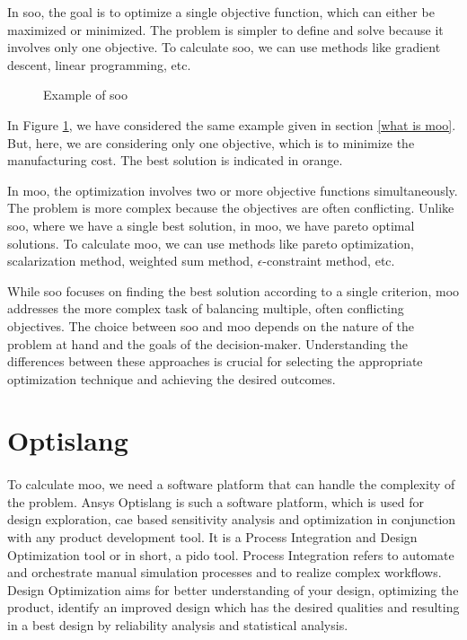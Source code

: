 In \acrfull{soo}, the goal is to optimize a single objective function, which can either be maximized or minimized. The  problem is simpler to define and solve
because it involves only one objective. To calculate \acrshort{soo}, we can use methods like gradient descent, linear programming, etc.

\begin{figure}[!h]
    \centering
    
    \caption{Example of \acrshort{soo}}
    \label{soo}
\end{figure}

In Figure \ref{soo}, we have considered the same example given in section \ref{what is moo}. But, here, we are considering only one objective, which is to
minimize the manufacturing cost. The best solution is indicated in orange.
\vspace{15pt}

In \acrshort{moo}, the optimization involves two or more objective functions simultaneously. The problem is more complex because the objectives are often
conflicting. Unlike \acrshort{soo}, where we have a single best solution, in \acrshort{moo}, we have pareto optimal solutions.
To calculate \acrshort{moo}, we can use methods like pareto optimization, scalarization method, weighted sum method, $\epsilon$-constraint method, etc.


While \acrshort{soo} focuses on finding the best solution according to a single criterion, \acrshort{moo} addresses the more complex task of balancing multiple, 
often conflicting objectives. The choice between \acrshort{soo} and \acrshort{moo} depends on the nature of the problem at hand and the goals of the decision-maker. 
Understanding the differences between these approaches is crucial for selecting the appropriate optimization technique and achieving the desired outcomes.

\section{Optislang}
\paragraph{}

To calculate \acrshort{moo}, we need a software platform that can handle the complexity of the problem. Ansys Optislang \cite{optislang} is such a software 
platform, which is used for design exploration, \acrfull{cae} based sensitivity analysis and optimization in conjunction with any product development tool. 
It is a Process Integration and Design Optimization tool or in short, a \acrshort{pido} tool. Process Integration refers to automate and orchestrate manual 
simulation processes and to realize complex workflows. Design Optimization aims for better understanding of your design, optimizing the product, identify an 
improved design which has the desired qualities and resulting in a best design by reliability analysis and statistical analysis.  


